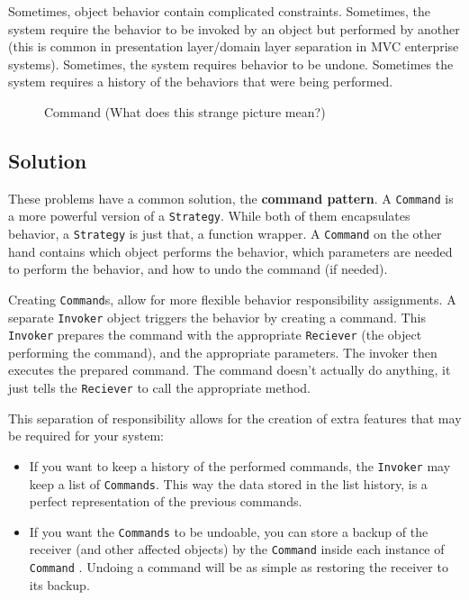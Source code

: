 Sometimes, object behavior contain complicated constraints. Sometimes,
the system require the behavior to be invoked by an object but performed
by another (this is common in presentation layer/domain layer separation
in MVC enterprise systems). Sometimes, the system requires behavior to
be undone. Sometimes the system requires a history of the behaviors that
were being performed.

\begin{figure}
\centering
{}
\caption{Command (What does this strange picture mean?)}
\end{figure}

\subsection{Solution}\label{behavioral-patterns.md__solution-2}

These problems have a common solution, the \textbf{command pattern}. A
\texttt{Command} is a more powerful version of a \texttt{Strategy}.
While both of them encapsulates behavior, a \texttt{Strategy} is just
that, a function wrapper. A \texttt{Command} on the other hand contains
which object performs the behavior, which parameters are needed to
perform the behavior, and how to undo the command (if needed).

Creating \texttt{Command}s, allow for more flexible behavior
responsibility assignments. A separate \texttt{Invoker} object triggers
the behavior by creating a command. This \texttt{Invoker} prepares the
command with the appropriate \texttt{Reciever} (the object performing
the command), and the appropriate parameters. The invoker then executes
the prepared command. The command doesn't actually do anything, it just
tells the \texttt{Reciever} to call the appropriate method.

This separation of responsibility allows for the creation of extra
features that may be required for your system:

\begin{itemize}
\item
  If you want to keep a history of the performed commands, the
  \texttt{Invoker} may keep a list of \texttt{Commands}. This way the
  data stored in the list history, is a perfect representation of the
  previous commands.
\item
  If you want the \texttt{Commands} to be undoable, you can store a
  backup of the receiver (and other affected objects) by the
  \texttt{Command} inside each instance of \texttt{Command} . Undoing a
  command will be as simple as restoring the receiver to its backup.
\end{itemize}

